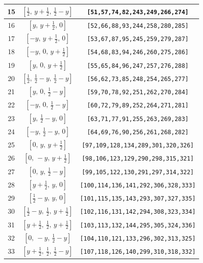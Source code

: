 \documentclass[fleqn,8pt]{jsarticle}
\begin{document}
\begin{longtable}{ccc}
15 & $\left[ \frac{1}{2},\, y + \frac{1}{2},\, \frac{1}{2} - y \right]$ & {\tt [51,57,74,82,243,249,266,274]} \\ \hline
16 & $\left[ y,\, y + \frac{1}{2},\, 0 \right]$ & {\tt [52,66,88,93,244,258,280,285]} \\ \hline
17 & $\left[ - y,\, y + \frac{1}{2},\, 0 \right]$ & {\tt [53,67,87,95,245,259,279,287]} \\ \hline
18 & $\left[ - y,\, 0,\, y + \frac{1}{2} \right]$ & {\tt [54,68,83,94,246,260,275,286]} \\ \hline
19 & $\left[ y,\, 0,\, y + \frac{1}{2} \right]$ & {\tt [55,65,84,96,247,257,276,288]} \\ \hline
20 & $\left[ \frac{1}{2},\, \frac{1}{2} - y,\, \frac{1}{2} - y \right]$ & {\tt [56,62,73,85,248,254,265,277]} \\ \hline
21 & $\left[ y,\, 0,\, \frac{1}{2} - y \right]$ & {\tt [59,70,78,92,251,262,270,284]} \\ \hline
22 & $\left[ - y,\, 0,\, \frac{1}{2} - y \right]$ & {\tt [60,72,79,89,252,264,271,281]} \\ \hline
23 & $\left[ y,\, \frac{1}{2} - y,\, 0 \right]$ & {\tt [63,71,77,91,255,263,269,283]} \\ \hline
24 & $\left[ - y,\, \frac{1}{2} - y,\, 0 \right]$ & {\tt [64,69,76,90,256,261,268,282]} \\ \hline
25 & $\left[ 0,\, y,\, y + \frac{1}{2} \right]$ & {\tt [97,109,128,134,289,301,320,326]} \\ \hline
26 & $\left[ 0,\, - y,\, y + \frac{1}{2} \right]$ & {\tt [98,106,123,129,290,298,315,321]} \\ \hline
27 & $\left[ 0,\, y,\, \frac{1}{2} - y \right]$ & {\tt [99,105,122,130,291,297,314,322]} \\ \hline
28 & $\left[ y + \frac{1}{2},\, y,\, 0 \right]$ & {\tt [100,114,136,141,292,306,328,333]} \\ \hline
29 & $\left[ \frac{1}{2} - y,\, y,\, 0 \right]$ & {\tt [101,115,135,143,293,307,327,335]} \\ \hline
30 & $\left[ \frac{1}{2} - y,\, \frac{1}{2},\, y + \frac{1}{2} \right]$ & {\tt [102,116,131,142,294,308,323,334]} \\ \hline
31 & $\left[ y + \frac{1}{2},\, \frac{1}{2},\, y + \frac{1}{2} \right]$ & {\tt [103,113,132,144,295,305,324,336]} \\ \hline
32 & $\left[ 0,\, - y,\, \frac{1}{2} - y \right]$ & {\tt [104,110,121,133,296,302,313,325]} \\ \hline
33 & $\left[ y + \frac{1}{2},\, \frac{1}{2},\, \frac{1}{2} - y \right]$ & {\tt [107,118,126,140,299,310,318,332]} \\ \hline

\end{longtable}
\end{document}
